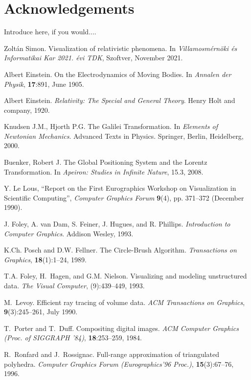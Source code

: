 \documentclass{egpubl}
\begin{document}
\section*{Acknowledgements}

Introduce here, if you would....


\begin{thebibliography}{1}


 Zoltán Simon.
\newblock Visualization of relativistic phenomena.
In \emph{Villamosmérnöki és Informatikai Kar 2021. évi TDK}, Szoftver, November 2021.

 Albert Einstein.
\newblock On the Electrodynamics of Moving Bodies.
In \emph{Annalen der Physik}, \textbf{17}:891, June 1905.

 Albert Einstein.
\newblock \emph{Relativity: The Special and General Theory}.
Henry Holt and company, 1920.

 Knudsen J.M., Hjorth P.G. The Galilei Transformation.
In \emph{Elements of Newtonian Mechanics}. Advanced Texts in Physics. Springer, Berlin, Heidelberg, 2000.

 Buenker, Robert J.
\newblock The Global Positioning System and the Lorentz Transformation.
In \emph{Apeiron: Studies in Infinite Nature}, 15.3, 2008.




 Y. Le Lous,
``Report on the First Eurographics Workshop on Visualization in
Scientific Computing'', \emph{Computer Graphics Forum\/}
\textbf{9}(4), pp. 371--372 (December 1990).

J. Foley, A. van Dam, S. Feiner, J. Hugues, and R. Phillips.
\newblock \emph{Introduction to Computer Graphics}.
\newblock Addison Wesley, 1993.

K.Ch. Posch and D.W. Fellner.
\newblock The Circle-Brush Algorithm.
\newblock \emph{Transactions on Graphics}, \textbf{18}(1):1--24, 1989.

T.A. Foley, H.~Hagen, and G.M. Nielson.
\newblock Visualizing and modeling unstructured data.
\newblock \emph{The Visual Computer}, (9):439--449, 1993.

M.~Levoy.
\newblock Efficient ray tracing of volume data.
\newblock \emph{ACM Transactions on Graphics},
          \textbf{9}(3):245--261, July 1990.

T.~Porter and T.~Duff.
\newblock Compositing digital images.
\newblock \emph{ACM Computer Graphics (Proc. of SIGGRAPH '84)},
          \textbf{18}:253--259, 1984.

R.~Ronfard and J.~Rossignac.
\newblock Full-range approximation of triangulated polyhedra.
\newblock \emph{Computer Graphics Forum (Eurographics'96 Proc.)},
          \textbf{15}(3):67--76, 1996.

\end{thebibliography}
\end{document}
